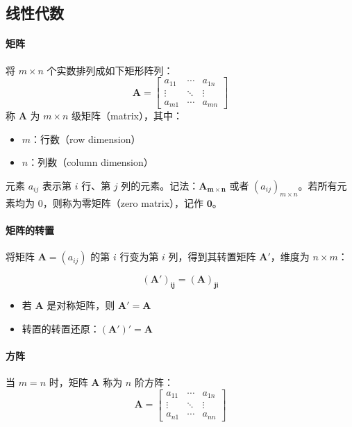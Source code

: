 \subsection{线性代数}

\paragraph*{矩阵}
将 \( m \times n \) 个实数排列成如下矩形阵列：
\begin{equation}
\mathbf{A} = 
\begin{bmatrix}
	a_{11} & \cdots & a_{1n} \\
	\vdots & \ddots & \vdots \\
	a_{m1} & \cdots & a_{mn}
\end{bmatrix}
\end{equation}
称 \( \mathbf{A} \) 为 \( m \times n \) 级矩阵（matrix），其中：
\begin{itemize}
	\item \( m \)：行数（row dimension）
	\item \( n \)：列数（column dimension）
\end{itemize}

\noindent 元素 \( a_{ij} \) 表示第 \( i \) 行、第 \( j \) 列的元素。记法：\( \mathbf{A_{m \times n}} \) 或者 \( (a_{ij})_{m \times n} \)。若所有元素均为 0，则称为零矩阵（zero matrix），记作 \( \bm{0} \)。

\paragraph*{矩阵的转置}
将矩阵 \( \mathbf{A} = (a_{ij}) \) 的第 \( i \) 行变为第 \( i \) 列，得到其转置矩阵 \( \mathbf{A'} \)，维度为 \( n \times m \)：

\begin{equation}
	\mathbf{(A')_{ij}} = \mathbf{(A)_{ji}}
\end{equation}

\begin{itemize}
	\item 若 \( \mathbf{A} \) 是对称矩阵，则 \( \mathbf{A'} = \mathbf{A} \)
	\item 转置的转置还原：\( \mathbf{(A')'} = \mathbf{A} \)
\end{itemize}

\paragraph*{方阵}
当 \( m = n \) 时，矩阵 \( \mathbf{A} \) 称为 \( n \) 阶方阵：
\begin{equation}
\mathbf{A} = 
\begin{bmatrix}
	a_{11} & \cdots & a_{1n} \\
	\vdots & \ddots & \vdots \\
	a_{n1} & \cdots & a_{nn}
\end{bmatrix}
\end{equation}

